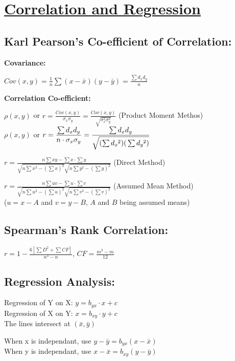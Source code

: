 \documentclass[Math.tex]{subfiles}
\begin{document}
\section*{\centering\huge\underline{Correlation and Regression}}

\subsection*{Karl Pearson's Co-efficient of Correlation:}

\textbf{Covariance:}

$\displaystyle Cov(x,y) = \frac{1}{n}\sum{(x - \bar{x})(y - \bar{y})} = \frac{\sum{d_x d_y}}{n}$

\textbf{Correlation Co-efficient:}

$\rho(x, y)$ or $\displaystyle r = \frac{Cov(x, y)}{\sigma_x\sigma_y} = \frac{Cov(x, y)}{\sqrt{\sigma_x^2 \sigma_y^2}}$ (Product Moment Methos)\\
$\rho(x, y)$ or $\displaystyle r = \frac{\sum{d_x d_y}}{n\cdot\sigma_x\sigma_y} = \frac{\sum{d_x d_y}}{\sqrt{(\sum{d\!\,_x\!\!\;^2)} (\vphantom{\int}\sum{d\!\,_y\!\!\;^2)}}}$

$\displaystyle r = \frac{n\sum xy - \sum x \cdot \sum y}{\sqrt{n\sum{x^2} - (\sum x)^2}\sqrt{n\sum{y^2} - (\sum y)^2}}$ (Direct Method)


$\displaystyle r = \frac{n\sum uv - \sum u \cdot \sum v}{\sqrt{n\sum{u^2} - (\sum u)^2}\sqrt{n\sum{v^2} - (\sum v)^2}}$ (Assumed Mean Method)\\
($u = x - A$ and $v = y - B$, $A$ and $B$ being assumed means)

\subsection*{Spearman's Rank Correlation:}
$\displaystyle r = 1 - \frac{6\left[\sum D^2 + \sum CF\right]}{n^3 - n}$, $\displaystyle CF = \frac{m^3 - m}{12}$


\subsection*{Regression Analysis:}

Regression of Y on X: $y = b_{yx}\cdot x + c$\\
Regression of X on Y: $x = b_{xy}\cdot y + c$\\
The lines intersect at $(\bar{x}, \bar{y})$

When x is independant, use $y - \bar{y} = b_{yx}(x - \bar{x})$\\
When y is independant, use $x - \bar{x} = b_{xy}(y - \bar{y})$
\end{document}
